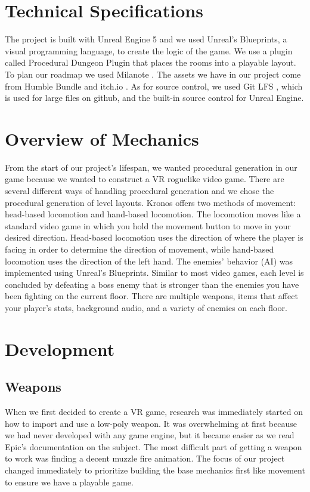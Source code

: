 \documentclass{sigchi}
\begin{document}
\section{Technical Specifications}
The project is built with Unreal Engine 5 \cite{unrealweb} and we used Unreal's Blueprints, a visual programming language, to create the logic of the game. We use a plugin called Procedural Dungeon Plugin \cite{dungeonplugin} that places the rooms into a playable layout. To plan our roadmap we used Milanote \cite{milanote}. The assets we have in our project come from Humble Bundle \cite{humble} and itch.io \cite{itch}. As for source control, we used Git LFS \cite{gitlfs}, which is used for large files on github, and the built-in source control for Unreal Engine.

\section{Overview of Mechanics}
From the start of our project's lifespan, we wanted procedural generation in our game because we wanted to construct a VR roguelike video game. There are several different ways of handling procedural generation and we chose the procedural generation of level layouts. Kronos offers two methods of movement: head-based locomotion and hand-based locomotion. The locomotion moves like a standard video game in which you hold the movement button to move in your desired direction. Head-based locomotion uses the direction of where the player is facing in order to determine the direction of movement, while hand-based locomotion uses the direction of the left hand. The enemies' behavior (AI) was implemented using Unreal's Blueprints. Similar to most video games, each level is concluded by defeating a boss enemy that is stronger than the enemies you have been fighting on the current floor. There are multiple weapons, items that affect your player's stats, background audio, and a variety of enemies on each floor.

\section{Development}
\subsection*{Weapons}
When we first decided to create a VR game, research was immediately started on how to import and use a low-poly weapon. It was overwhelming at first because we had never developed with any game engine, but it became easier as we read Epic's documentation on the subject. The most difficult part of getting a weapon to work was finding a decent muzzle fire animation. The focus of our project changed immediately to prioritize building the base mechanics first like movement to ensure we have a playable game.
\end{document}
